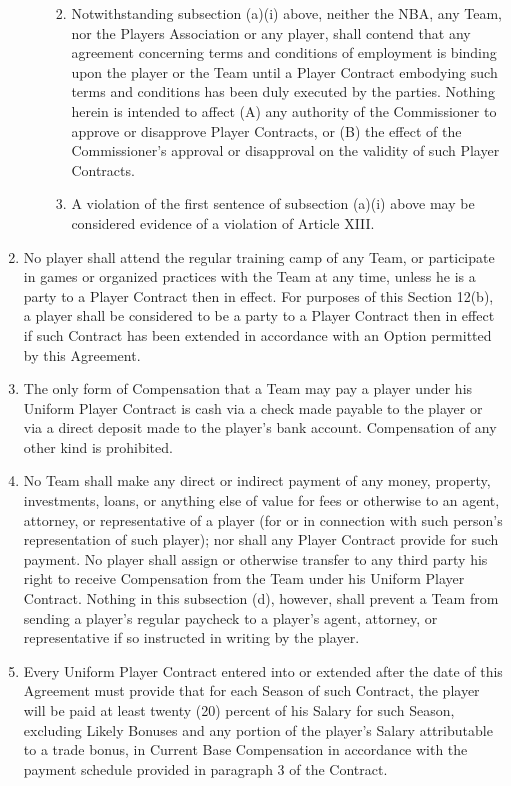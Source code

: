 \documentclass[
]{book}
\providecommand{\tightlist}{%
  \setlength{\itemsep}{0pt}\setlength{\parskip}{0pt}}
\begin{document}
\begin{enumerate}
\begin{enumerate}
    \begin{enumerate}
    \def\labelenumiii{(\roman{enumiii})}
    \setcounter{enumiii}{1}
    \tightlist
    \item
      Notwithstanding subsection (a)(i) above, neither the NBA, any Team, nor the Players Association or any player, shall contend that any agreement concerning terms and conditions of employment is binding upon the player or the Team until a Player Contract embodying such terms and conditions has been duly executed by the parties. Nothing herein is intended to affect (A) any authority of the Commissioner to approve or disapprove Player Contracts, or (B) the effect of the Commissioner's approval or disapproval on the validity of such Player Contracts.
    \item
      A violation of the first sentence of subsection (a)(i) above may be considered evidence of a violation of Article XIII.
    \end{enumerate}
  \end{enumerate}
\item
  No player shall attend the regular training camp of any Team, or participate in games or organized practices with the Team at any time, unless he is a party to a Player Contract then in effect. For purposes of this Section 12(b), a player shall be considered to be a party to a Player Contract then in effect if such Contract has been extended in accordance with an Option permitted by this Agreement.
\item
  The only form of Compensation that a Team may pay a player under his Uniform Player Contract is cash via a check made payable to the player or via a direct deposit made to the player's bank account. Compensation of any other kind is prohibited.
\item
  No Team shall make any direct or indirect payment of any money, property, investments, loans, or anything else of value for fees or otherwise to an agent, attorney, or representative of a player (for or in connection with such person's representation of such player); nor shall any Player Contract provide for such payment. No player shall assign or otherwise transfer to any third party his right to receive Compensation from the Team under his Uniform Player Contract. Nothing in this subsection (d), however, shall prevent a Team from sending a player's regular paycheck to a player's agent, attorney, or representative if so instructed in writing by the player.
\item
  Every Uniform Player Contract entered into or extended after the date of this Agreement must provide that for each Season of such Contract, the player will be paid at least twenty (20) percent of his Salary for such Season, excluding Likely Bonuses and any portion of the player's Salary attributable to a trade bonus, in Current Base Compensation in accordance with the payment schedule provided in paragraph 3 of the Contract.

\end{enumerate}
\end{document}
